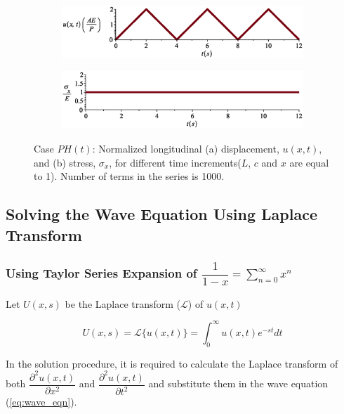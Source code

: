 \documentclass{article}
\begin{document}
\begin{figure}[H]
        \begin{subfigure}{0.9\textwidth}
            \includegraphics[width=\columnwidth]{figures/a_u_sv.eps} 
            \caption{}
        \end{subfigure}
        \begin{subfigure}{0.9\textwidth}
            \includegraphics[width=\columnwidth]{figures/a_sigma_sv.eps} 
            \caption{}
        \end{subfigure}
    \caption{Case $P H(t)$: Normalized longitudinal (a) displacement, $u(x, t)$, and (b) stress, $\sigma_x$, for different time increments($L$, $c$ and $x$ are equal to 1). Number of terms in the series is 1000.}
    \label{fig:u_sigma_sv}
\end{figure}


\subsection{Solving the Wave Equation Using Laplace Transform}

\subsubsection{Using Taylor Series Expansion of $\dfrac{1}{1 - x} = \displaystyle\sum_{n = 0}^{\infty} x^n$}
Let $U(x, s)$ be the Laplace transform ($\mathcal{L}$) of $u(x, t)$

\begin{equation}
    U(x, s) = \mathcal{L}\{u(x, t)\} = \int_{0}^{\infty} u(x, t) e^{-st} dt
    \label{eq:laplace_u}
\end{equation}

In the solution procedure, it is required to calculate the Laplace transform of both $\dfrac{\partial^2 u(x, t)}{\partial x^2}$ and $\dfrac{\partial^2 u(x, t)}{\partial t^2}$ and substitute them in the wave equation (\cref{eq:wave_eqn}). \\
\end{document}
